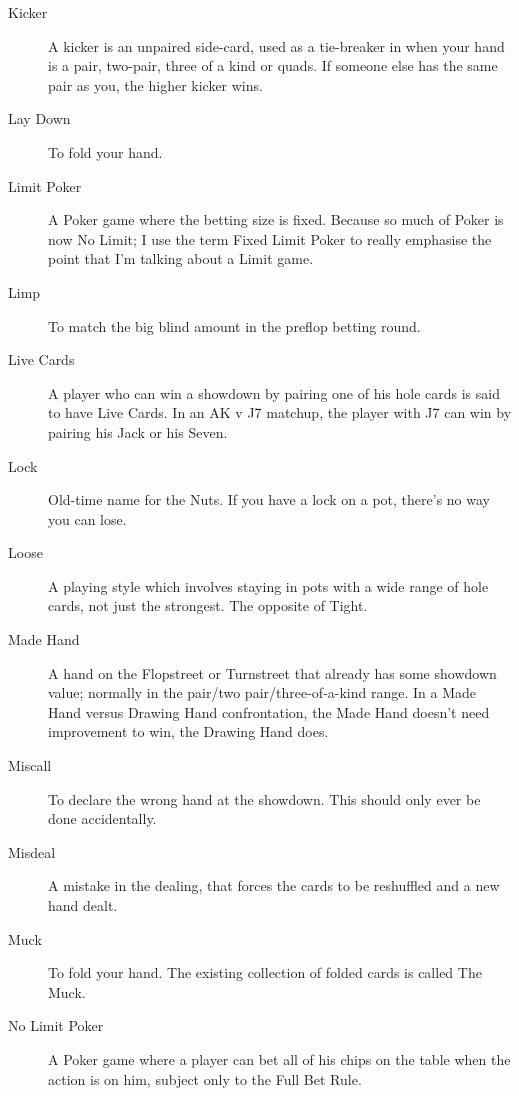 \begin{description}
\item[Kicker] A kicker is an unpaired side-card, used as a tie-breaker
in when your hand is a pair, two-pair, three of a kind or quads. If
someone else has the same pair as you, the higher kicker wins.

\item[Lay Down] To fold your hand.

\item[Limit Poker] A Poker game where the betting size is
fixed. Because so much of Poker is now No Limit; I use the term
Fixed Limit Poker to really emphasise the point that I'm talking about
a Limit game.

\item[Limp] To match the big blind amount in the preflop betting
round.

\item[Live Cards] A player who can win a showdown by pairing one of
his hole cards is said to have Live Cards. In an AK v J7 matchup, the
player with J7 can win by pairing his Jack or his Seven.

\item[Lock] Old-time name for the Nuts. If you have a lock on a pot,
there's no way you can lose.

\item[Loose] A playing style which involves staying in pots with a
wide range of hole cards, not just the strongest. The opposite of
Tight.

\item[Made Hand] A hand on the Flopstreet or Turnstreet that already
has some showdown value; normally in the pair/two pair/three-of-a-kind
range. In a Made Hand versus Drawing Hand confrontation, the Made Hand
doesn't need improvement to win, the Drawing Hand does.

\item[Miscall] To declare the wrong hand at the showdown. This should
only ever be done accidentally.

\item[Misdeal] A mistake in the dealing, that forces the cards to be
reshuffled and a new hand dealt.

\item[Muck] To fold your hand. The existing collection of folded cards
is called The Muck.

\item[No Limit Poker] A Poker game where a player can bet all of his
chips on the table when the action is on him, subject only to the Full
Bet Rule.


\end{description}
